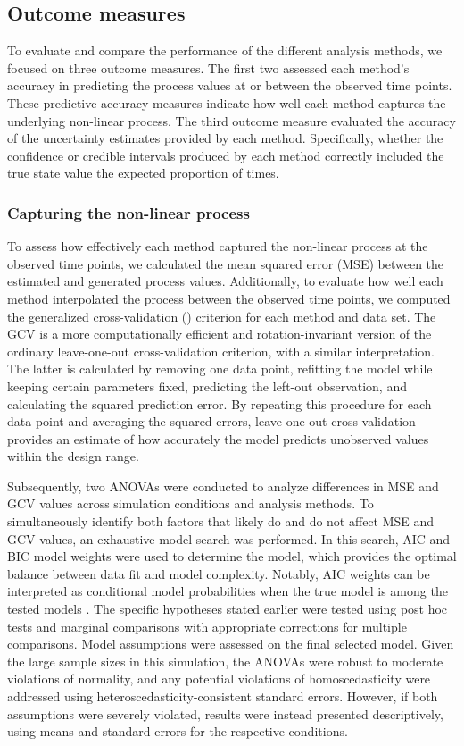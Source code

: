 \documentclass[man, floatsintext]{apa7}
\begin{document}
\subsection{Outcome measures}

To evaluate and compare the performance of the different analysis methods, we
focused on three outcome measures. The first two assessed each method's
accuracy in predicting the process values at or between the observed time
points. These predictive accuracy measures indicate how well each method
captures the underlying non-linear process. The third outcome measure evaluated
the accuracy of the uncertainty estimates provided by each method.
Specifically, whether the confidence or credible intervals produced
by each method correctly included the true state value the expected proportion
of times.

\subsubsection{Capturing the non-linear process}

To assess how effectively each method captured the non-linear process at the
observed time points, we calculated the mean squared error (MSE) between the
estimated and generated process values. Additionally,
to evaluate how well each method
interpolated the process between the observed time points, we computed the
generalized cross-validation (\parencite[GCV;][]{golub_generalized_1979})
criterion
for each method and data set. The GCV is a more computationally efficient and
rotation-invariant version of the ordinary leave-one-out cross-validation
criterion, with a similar interpretation. The latter is calculated by removing
one data point, refitting the
model while keeping certain parameters fixed, predicting the left-out
observation, and calculating the squared
prediction error. By repeating this procedure for each data point and averaging
the squared errors, leave-one-out cross-validation provides an estimate of
how accurately the model
predicts unobserved values within the design range.

Subsequently, two ANOVAs were conducted to analyze differences in MSE and GCV
values across simulation conditions and analysis methods. To simultaneously
identify both factors that likely
do and do not affect MSE and GCV values, an exhaustive model search was
performed. In this search, AIC and BIC model weights were used to determine the
model, which provides the optimal balance between data fit and model
complexity. Notably, AIC weights can
be interpreted as conditional model probabilities when the true model is among
the tested models \parencite{wagenmakers_aic_2004}. The specific hypotheses
stated earlier
were tested using post hoc tests and marginal comparisons with appropriate
corrections for multiple comparisons.
Model assumptions were assessed on the final selected model. Given
the large sample sizes in this simulation, the ANOVAs were robust to moderate
violations of normality, and any potential violations of homoscedasticity were
addressed using heteroscedasticity-consistent standard errors. However, if both
assumptions were severely violated, results were instead presented
descriptively, using means and standard errors for the respective conditions.
\end{document}
